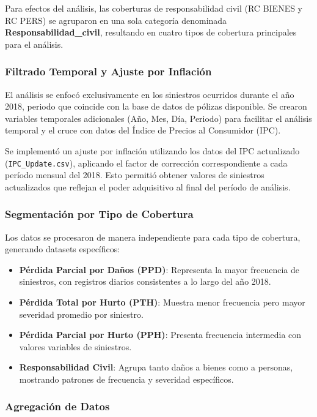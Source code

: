 Para efectos del análisis, las coberturas de responsabilidad civil (RC BIENES y RC PERS) se agruparon en una sola categoría denominada \textbf{Responsabilidad\_civil}, resultando en cuatro tipos de cobertura principales para el análisis.

\subsubsection{Filtrado Temporal y Ajuste por Inflación}

El análisis se enfocó exclusivamente en los siniestros ocurridos durante el año 2018, periodo que coincide con la base de datos de pólizas disponible. Se crearon variables temporales adicionales (Año, Mes, Día, Periodo) para facilitar el análisis temporal y el cruce con datos del Índice de Precios al Consumidor (IPC).

\medskip

Se implementó un ajuste por inflación utilizando los datos del IPC actualizado (\texttt{IPC\_Update.csv}), aplicando el factor de corrección correspondiente a cada período mensual del 2018. Esto permitió obtener valores de siniestros actualizados que reflejan el poder adquisitivo al final del período de análisis.

\subsubsection{Segmentación por Tipo de Cobertura}

Los datos se procesaron de manera independiente para cada tipo de cobertura, generando datasets específicos:

\begin{itemize}
    \item \textbf{Pérdida Parcial por Daños (PPD)}: Representa la mayor frecuencia de siniestros, con registros diarios consistentes a lo largo del año 2018.
    \item \textbf{Pérdida Total por Hurto (PTH)}: Muestra menor frecuencia pero mayor severidad promedio por siniestro.
    \item \textbf{Pérdida Parcial por Hurto (PPH)}: Presenta frecuencia intermedia con valores variables de siniestros.
    \item \textbf{Responsabilidad Civil}: Agrupa tanto daños a bienes como a personas, mostrando patrones de frecuencia y severidad específicos.
\end{itemize}

\subsubsection{Agregación de Datos}

